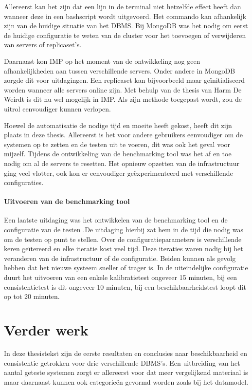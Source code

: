 Allereerst kan het zijn dat een lijn in de terminal niet hetzelfde effect heeft dan wanneer deze in een bashscript wordt uitgevoerd. Het commando kan afhankelijk zijn van de huidige situatie van het DBMS. Bij MongoDB was het nodig om eerst de huidige configuratie te weten van de cluster voor het toevoegen of verwijderen van servers of replicaset's. 

Daarnaast kon IMP op het moment van de ontwikkeling nog geen afhankelijkheden aan tussen verschillende servers. Onder andere in MongoDB zorgde dit voor uitdagingen. Een replicaset kan bijvoorbeeld maar geïnitialiseerd worden wanneer alle servers online zijn. Met behulp van de thesis van Harm De Weirdt\cite{thesisHarm} is dit nu wel mogelijk in IMP. Als zijn methode toegepast wordt, zou de uitrol eenvoudiger kunnen verlopen.  

Hoewel de automatisatie de nodige tijd en moeite heeft gekost, heeft dit zijn plaats in deze thesis. Allereerst is het voor andere gebruikers eenvoudiger om de systemen op te zetten en de testen uit te voeren, dit was ook het geval voor mijzelf. Tijdens de ontwikkeling van de benchmarking tool was het af en toe nodig om al de servers te resetten. Het opnieuw opzetten van de infrastructuur ging veel vlotter, ook kon er eenvoudiger geëxperimenteerd met verschillende configuraties. 

\paragraph{Uitvoeren van de benchmarking tool} Een laatste uitdaging was het ontwikkelen van de benchmarking tool en de configuratie van de testen .De uitdaging hierbij zat hem in de tijd die nodig was om de testen op punt te stellen. Over de configuratieparameters is verschillende keren geïtereerd en elke iteratie kost veel tijd. Deze iteraties waren nodig bij het veranderen van de infrastructuur of de configuratie. Beiden kunnen als gevolg hebben dat het nieuwe systeem sneller of trager is. In de uiteindelijke configuratie duurt het uitvoeren van een enkele kalibratietest ongeveer 15 minuten, bij een consistentietest is dit ongeveer 10 minuten, bij een beschikbaarheidstest loopt dit op tot 20 minuten. 

\section{Verder werk}
In deze thesistekst zijn de eerste resultaten en conclusies naar beschikbaarheid en consistentie getrokken voor drie verschillende DBMS's. Een uitbreiding van het aantal geteste systemen zorgt er allereerst voor dat meer vergelijkend materiaal is maar daarnaast kunnen ook categorieën gevormd worden zoals bij het datamodel. 

